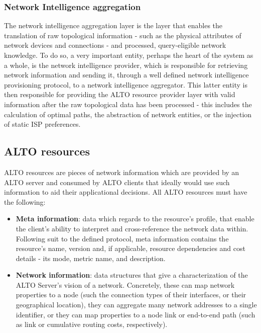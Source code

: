 \documentclass[
  oneside,
  11pt, a4paper,
  footinclude=true,
  headinclude=true,
  cleardoublepage=empty
]{scrbook}
\begin{document}
	\subsubsection{Network Intelligence aggregation}
	
	The network intelligence aggregation layer is the layer that enables the translation of raw topological information - such as the physical attributes of network devices and connections - and processed, query-eligible network knowledge. To do so, a very important entity, perhaps the heart of the system as a whole, is the network intelligence provider, which is responsible for retrieving network information and sending it, through a well defined network intelligence provisioning protocol, to a network intelligence aggregator. This latter entity is then responsible for providing the ALTO resource provider layer with valid information after the raw topological data has been processed - this includes the calculation of optimal paths, the abstraction of network entities, or the injection of static ISP preferences.

	
	\subsection{ALTO resources}
    \label{ssec:alto-resources}

    ALTO resources are pieces of network information which are provided by an ALTO server and consumed by ALTO clients that ideally would use such information to aid their applicational decisions. All ALTO resources must have the following:
    
    \begin{itemize}
        \item \textbf{Meta information}: data which regards to the resource's profile, that enable the client's ability to interpret and cross-reference the network data within. Following suit to the defined protocol, meta information contains the resource's name, version and, if applicable, resource dependencies and cost details - its mode, metric name, and description.
        \item \textbf{Network information}: data structures that give a characterization of the ALTO Server's vision of a network. Concretely, these can map network properties to a node (such the connection types of their interfaces, or their geographical location), they can aggregate many network addresses to a single identifier, or they can map properties to a node link or end-to-end path (such as link or cumulative routing costs, respectively). 
    \end{itemize}{}
    
\end{document}
